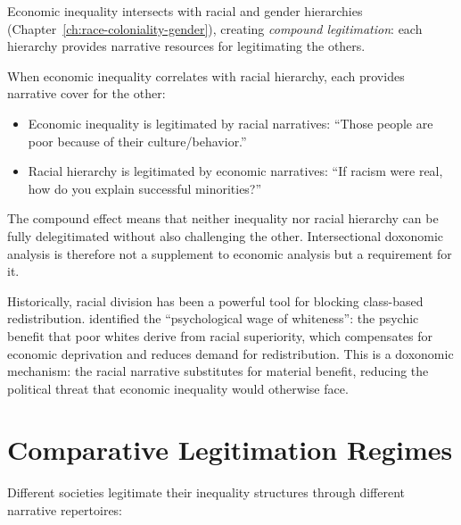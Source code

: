 Economic inequality intersects with racial and gender hierarchies (Chapter~\ref{ch:race-coloniality-gender}), creating \emph{compound legitimation}: each hierarchy provides narrative resources for legitimating the others.

\begin{proposition}
\label{prop:compound}
When economic inequality correlates with racial hierarchy, each provides narrative cover for the other:
\begin{itemize}[nosep]
  \item Economic inequality is legitimated by racial narratives: ``Those people are poor because of their culture/behavior.''
  \item Racial hierarchy is legitimated by economic narratives: ``If racism were real, how do you explain successful minorities?''
\end{itemize}
The compound effect means that neither inequality nor racial hierarchy can be fully delegitimated without also challenging the other.
Intersectional doxonomic analysis is therefore not a supplement to economic analysis but a requirement for it.
\end{proposition}

Historically, racial division has been a powerful tool for blocking class-based redistribution.
\textcite{du-bois2007} identified the ``psychological wage of whiteness'': the psychic benefit that poor whites derive from racial superiority, which compensates for economic deprivation and reduces demand for redistribution.
This is a doxonomic mechanism: the racial narrative substitutes for material benefit, reducing the political threat that economic inequality would otherwise face.

\section{Comparative Legitimation Regimes}
\label{sec:ch24-comparative}

Different societies legitimate their inequality structures through different narrative repertoires:

